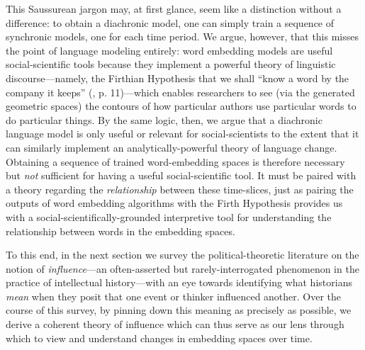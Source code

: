 \documentclass[11pt]{article}
\begin{document}
This Saussurean jargon may, at first glance, seem like a distinction without a difference: to obtain a diachronic model, one can simply train a sequence of synchronic models, one for each time period. We argue, however, that this misses the point of language modeling entirely: word embedding models are useful social-scientific tools because they implement a powerful theory of linguistic discourse---namely, the Firthian Hypothesis that we shall ``know a word by the company it keeps'' (\cite{firth_papers_1957}, p. 11)---which enables researchers to see (via the generated geometric spaces) the contours of how particular authors use particular words to do particular things. By the same logic, then, we argue that a diachronic language model is only useful or relevant for social-scientists to the extent that it can similarly implement an analytically-powerful theory of language change. Obtaining a sequence of trained word-embedding spaces is therefore necessary but \textit{not} sufficient for having a useful social-scientific tool. It must be paired with a theory regarding the \textit{relationship} between these time-slices, just as pairing the outputs of word embedding algorithms with the Firth Hypothesis provides us with a social-scientifically-grounded interpretive tool for understanding the relationship between words in the embedding spaces.

To this end, in the next section we survey the political-theoretic literature on the notion of \textit{influence}---an often-asserted but rarely-interrogated phenomenon in the practice of intellectual history---with an eye towards identifying what historians \textit{mean} when they posit that one event or thinker influenced another. Over the course of this survey, by pinning down this meaning as precisely as possible, we derive a coherent theory of influence which can thus serve as our lens through which to view and understand changes in embedding spaces over time.

\end{document}
